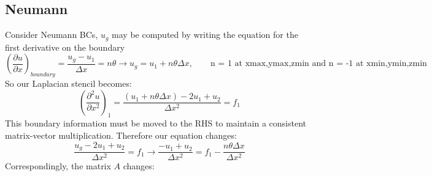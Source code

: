 \documentclass[landscape]{article}
\begin{document}
\subsection{Neumann}
Consider Neumann BCs, $u_g$ may be computed by writing the equation for the first derivative on the boundary
\begin{equation}
  \left(\frac{\partial u}{\partial x}\right)_{boundary}
  = \frac{u_g - u_1}{\Delta x} = n \theta
  \rightarrow
  u_g = u_1 + n \theta \Delta x, \qquad \text{n = 1 at xmax,ymax,zmin and n = -1 at xmin,ymin,zmin}
\end{equation}
So our Laplacian stencil becomes:
\begin{equation}
   \left(\frac{\partial^2 u}{\partial x^2}\right)_{1} =
   \frac{(u_1 + n \theta \Delta x) - 2 u_1 + u_{2}}{\Delta x^2} = f_1
\end{equation}
This boundary information must be moved to the RHS to maintain a consistent matrix-vector multiplication. Therefore our equation changes:
\begin{equation}
   \frac{u_g - 2 u_1 + u_{2}}{\Delta x^2} = f_1
   \rightarrow
   \frac{- u_1 + u_{2}}{\Delta x^2} = f_1 - \frac{n\theta \Delta x}{\Delta x^2}
\end{equation}
Correspondingly, the matrix $A$ changes:
\end{document}
